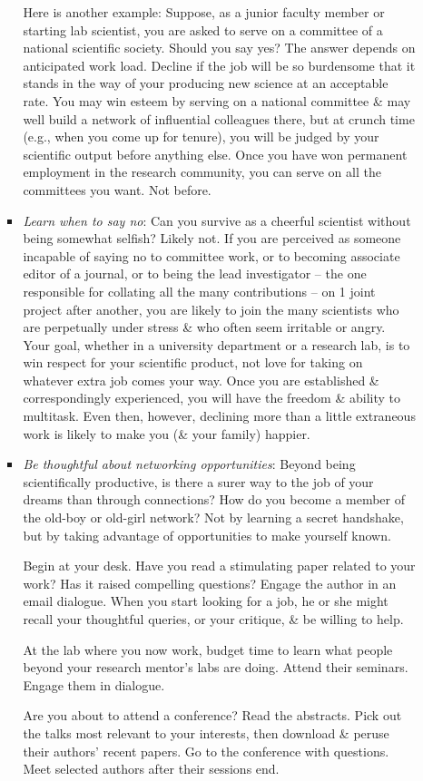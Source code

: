 \documentclass{article}
\begin{document}
\begin{enumerate}
\begin{itemize}
\begin{itemize}
			Here is another example: Suppose, as a junior faculty member or starting lab scientist, you are asked to serve on a committee of a national scientific society. Should you say yes? The answer depends on anticipated work load. Decline if the job will be so burdensome that it stands in the way of your producing new science at an acceptable rate. You may win esteem by serving on a national committee \& may well build a network of influential colleagues there, but at crunch time (e.g., when you come up for tenure), you will be judged by your scientific output before anything else. Once you have won permanent employment in the research community, you can serve on all the committees you want. Not before.
			\item {\it Learn when to say no}: Can you survive as a cheerful scientist without being somewhat selfish? Likely not. If you are perceived as someone incapable of saying no to committee work, or to becoming associate editor of a journal, or to being the lead investigator -- the one responsible for collating all the many contributions -- on 1 joint project after another, you are likely to join the many scientists who are perpetually under stress \& who often seem irritable or angry. Your goal, whether in a university department or a research lab, is to win respect for your scientific product, not love for taking on whatever extra job comes your way. Once you are established \& correspondingly experienced, you will have the freedom \& ability to multitask. Even then, however, declining more than a little extraneous work is likely to make you (\& your family) happier.
			\item {\it Be thoughtful about networking opportunities}: Beyond being scientifically productive, is there a surer way to the job of your dreams than through connections? How do you become a member of the old-boy or old-girl network? Not by learning a secret handshake, but by taking advantage of opportunities to make yourself known.
			
			Begin at your desk. Have you read a stimulating paper related to your work? Has it raised compelling questions? Engage the author in an email dialogue. When you start looking for a job, he or she might recall your thoughtful queries, or your critique, \& be willing to help.
			
			At the lab where you now work, budget time to learn what people beyond your research mentor's labs are doing. Attend their seminars. Engage them in dialogue.
			
			Are you about to attend a conference? Read the abstracts. Pick out the talks most relevant to your interests, then download \& peruse their authors' recent papers. Go to the conference with questions. Meet selected authors after their sessions end.
			

\end{itemize}
\end{itemize}
\end{enumerate}
\end{document}
